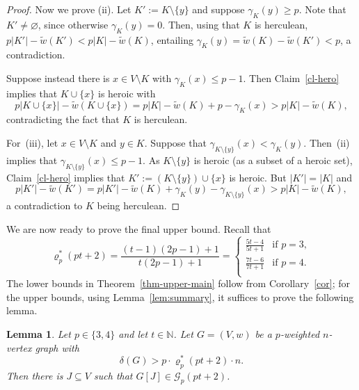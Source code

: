 \documentclass[11pt, a4paper]{article}
\newtheorem{lemma}[theorem]{Lemma}
\theoremstyle{definition}
\newcommand{\cG}{\mathcal{G}}
\begin{document}
\begin{proof}
	Now we prove (ii). Let $K' := K\setminus\lbrace y \rbrace$ and suppose $\gamma_K(y) \geq p$. Note that $K'\neq\varnothing$, since otherwise $\gamma_K(y)=0$. Then, using that $K$ is herculean, $p|K'|-\tilde{w}(K')<p|K|-\tilde{w}(K)$, entailing
	$\gamma_K(y)=\tilde{w}(K)-\tilde{w}(K')<p$, a contradiction.
	
	Suppose instead there is $x \in V\setminus K$ with $\gamma_K(x) \leq p-1$.
	Then Claim~\ref{cl-hero} implies that $K \cup\lbrace x\rbrace$ is heroic with 
	$$p|K \cup \lbrace x\rbrace| - \tilde{w}(K \cup \lbrace x\rbrace)=p|K|-\tilde{w}(K)+p-\gamma_K(x)>p|K|-\tilde{w}(K),$$ 
	contradicting the fact that $K$ is herculean.
	
	For~(iii), let $x \in V\setminus K$ and $y \in K$.
	Suppose that $\gamma_{K\setminus\{y\}}(x) < \gamma_K(y)$.
	Then~(ii) implies that $\gamma_{K\setminus\{y\}}(x) \leq p-1$.
	As $K\setminus\lbrace y \rbrace$ is heroic (as a subset of a heroic set), Claim~\ref{cl-hero} implies that $K' := (K\setminus\lbrace y \rbrace)\cup\lbrace x\rbrace$ is heroic. But $|K'|=|K|$ and 
	$$p|K'|-\tilde{w}(K') = p|K'|-\tilde{w}(K)+\gamma_K(y)-\gamma_{K\setminus\{y\}}(x) > p|K|-\tilde{w}(K),$$ 
	a contradiction to $K$ being herculean. 
\end{proof}

We are now ready to prove the final upper bound.
Recall that
$$
\varrho^*_p(pt+2) = \frac{(t-1)(2p-1)+1}{t(2p-1)+1} =
\begin{cases}
	\frac{5t-4}{5t+1} &\text{if }p=3,\\
	\frac{7t-6}{7t+1} &\text{if }p=4.\\
\end{cases}
$$
The lower bounds in Theorem~\ref{thm-upper-main} follow from Corollary~\ref{cor}; for the upper bounds, using Lemma~\ref{lem:summary}, it suffices to prove the following lemma.

\begin{lemma}\label{smallp}
	Let $p \in\lbrace 3,4\rbrace$ and let $t\in\mathbb{N}$.
	Let $G=(V,w)$ be a $p$-weighted $n$-vertex graph with
	$$\delta(G)>p \cdot \varrho_p^*(pt+2) \cdot n.$$
	Then there is $J \subseteq V$ such that $G[J] \in \cG_p(pt+2)$.
\end{lemma}
\end{document}
